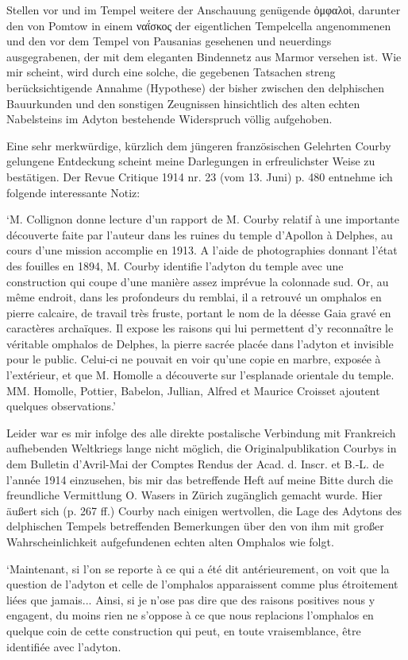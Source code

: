\documentclass[a4paper, 11pt, oneside]{article}
\begin{document}
Stellen vor und im Tempel weitere der Anschauung genügende ὀμφαλοὶ, darunter den von Pomtow in einem ναΐσκος der eigentlichen Tempelcella angenommenen und den vor dem Tempel von Pausanias gesehenen und neuerdings ausgegrabenen, der mit dem eleganten Bindennetz aus Marmor versehen ist. Wie mir scheint, wird durch eine solche, die gegebenen Tatsachen streng berücksichtigende Annahme (Hypothese) der bisher zwischen den delphischen Bauurkunden und den sonstigen Zeugnissen hinsichtlich des alten echten Nabelsteins im Adyton bestehende Widerspruch völlig aufgehoben.

Eine sehr merkwürdige, kürzlich dem jüngeren französischen Gelehrten Courby gelungene Entdeckung scheint meine Darlegungen in erfreulichster Weise zu bestätigen. Der Revue Critique 1914 nr. 23 (vom 13. Juni) p. 480 entnehme ich folgende interessante Notiz:

`M. Collignon donne lecture d'un rapport de M. Courby relatif à une importante découverte faite par l'auteur dans les ruines du temple d'Apollon à Delphes, au cours d'une mission accomplie en 1913. A l'aide de photographies donnant l'état des fouilles en 1894, M. Courby identifie l'adyton du temple avec une construction qui coupe d'une manière assez imprévue la colonnade sud. Or, au même endroit, dans les profondeurs du remblai, il a retrouvé un omphalos en pierre calcaire, de travail très fruste, portant le nom de la déesse Gaia gravé en caractères archaïques. Il expose les raisons qui lui permettent d'y reconnaître le véritable omphalos de Delphes, la pierre sacrée placée dans l'adyton et invisible pour le public. Celui-ci ne pouvait en voir qu'une copie en marbre, exposée à l'extérieur, et que M. Homolle a découverte sur l'esplanade orientale du temple. MM. Homolle, Pottier, Babelon, Jullian, Alfred et Maurice Croisset ajoutent quelques observations.'

Leider war es mir infolge des alle direkte postalische Verbindung mit Frankreich aufhebenden Weltkriegs lange nicht möglich, die Originalpublikation Courbys in dem Bulletin d'Avril-Mai der Comptes Rendus der Acad. d. Inscr. et B.-L. de l'année 1914 einzusehen, bis mir das betreffende Heft auf meine Bitte durch die freundliche Vermittlung O. Wasers in Zürich zugänglich gemacht wurde. Hier äußert sich (p. 267 ff.) Courby nach einigen wertvollen, die Lage des Adytons des delphischen Tempels betreffenden Bemerkungen über den von ihm mit großer Wahrscheinlichkeit aufgefundenen echten alten Omphalos wie folgt.

`Maintenant, si l'on se reporte à ce qui a été dit antérieurement, on voit que la question de l'adyton et celle de l'omphalos apparaissent comme plus étroitement liées que jamais... Ainsi, si je n'ose pas dire que des raisons positives nous y engagent, du moins rien ne s'oppose à ce que nous replacions l'omphalos en quelque coin de cette construction qui peut, en toute vraisemblance, être identifiée avec l'adyton.
\end{document}
